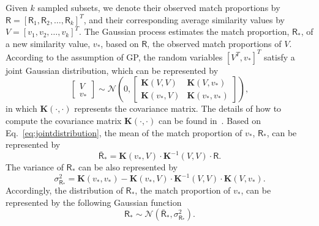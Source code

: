   Given $k$ sampled subsets, we denote their observed match proportions by $\mathsf{R} = [\mathsf{R}_1, \mathsf{R}_2, \ldots, \mathsf{R}_k]^T$, and their corresponding average similarity values by $V = [v_1, v_2, \ldots, v_k]^T$. The Gaussian process estimates the match proportion, $\mathsf{R}_*$, of a new similarity value, $v_*$, based on $\mathsf{R}$, the observed match proportions of $V$. According to the assumption of GP, the random variables $[V^T, v_*]^T$ satisfy a joint Gaussian distribution, which can be represented by
  \begin{equation}
  \begin{bmatrix} V \\ v_* \end{bmatrix} \sim
  \mathcal{N}\left(0, \begin{bmatrix} \mathbf{K}(V, V) & \mathbf{K}(V, v_*) \\ \mathbf{K}(v_*, V) & \mathbf{K}(v_*, v_*) \end{bmatrix}\right),
  \label{eq:jointdistribution}
  \end{equation}
in which $\mathbf{K}(\cdot , \cdot)$ represents the covariance matrix. The details of how to compute the covariance matrix $\mathbf{K}(\cdot , \cdot)$ can be found in~\cite{chen2017humoreport}. Based on Eq.~\ref{eq:jointdistribution}, the mean of the match proportion of $v_*$, $\mathsf{R}_*$, can be represented by
  \begin{equation}
  \bar{\mathsf{R}}_* = \mathbf{K}(v_*, V) \cdot \mathbf{K}^{-1}(V, V) \cdot \mathsf{R}.
  \label{eq:gpr:mean}
  \end{equation}
The variance of $\mathsf{R}_*$ can be also represented by
\begin{equation}
  \sigma_{\mathsf{R}_*}^2 = \mathbf{K}(v_*, v_*) - \mathbf{K}(v_*, V) \cdot \mathbf{K}^{-1}(V, V) \cdot \mathbf{K}(V, v_*).
\label{eq:gpr:variance}
\end{equation}
Accordingly, the distribution of $\mathsf{R}_*$, the match proportion of $v_*$, can be represented by the following Gaussian function
\begin{equation}
  \mathsf{R}_* \sim \mathcal{N}\left(\bar{\mathsf{R}}_*, \sigma_{\mathsf{R}_*}^2\right).
\end{equation}

